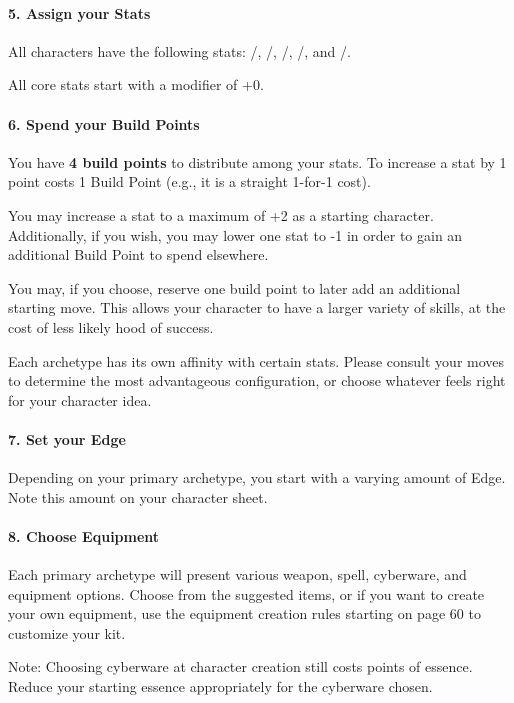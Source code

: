\documentclass[oneside,10pt]{article}
\begin{document}
\begin{multicols}{2}
\paragraph{5.  Assign your Stats}

All characters have the following stats: \oomph/, \twitch/,
\mastery/, \flair/, and \essence/.

All core stats start with a modifier of +0.

\paragraph{6.  Spend your Build Points}

You have \textbf{4 build points} to distribute among your stats. To
increase a stat by 1 point costs 1 Build Point (e.g., it is a
straight 1-for-1 cost).

You may increase a stat to a maximum of +2 as a starting
character. Additionally, if you wish, you may lower one stat
to -1 in order to gain an additional Build Point to spend elsewhere.

You may, if you choose, reserve one build point to later add
an additional starting move. This allows your character to have a
larger variety of skills, at the cost of less likely hood of success.

Each archetype has its own affinity with certain stats. Please consult
your moves to determine the most advantageous configuration, or choose
whatever feels right for your character idea.

\paragraph{7.  Set your Edge}

Depending on your primary archetype, you start with a varying
amount of Edge. Note this amount on your character sheet.

\paragraph{8.  Choose Equipment}

Each primary archetype will present various weapon, spell, cyberware,
and equipment options. Choose from the suggested items, or if you want
to create your own equipment, use the equipment creation rules
starting on page 60 to customize your kit.

Note: Choosing cyberware at character creation still costs points of
essence. Reduce your starting essence appropriately for the cyberware chosen.


\end{multicols}
\end{document}
